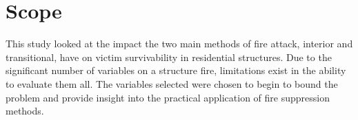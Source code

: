 \documentclass[12pt,oneside]{book}
\begin{document}





\clearpage

\section{Scope}
This study looked at the impact the two main methods of fire attack, interior and transitional, have on victim survivability in residential structures. Due to the significant number of variables on a structure fire, limitations exist in the ability to evaluate them all. The variables selected were chosen to begin to bound the problem and provide insight into the practical application of fire suppression methods. 
\end{document}
